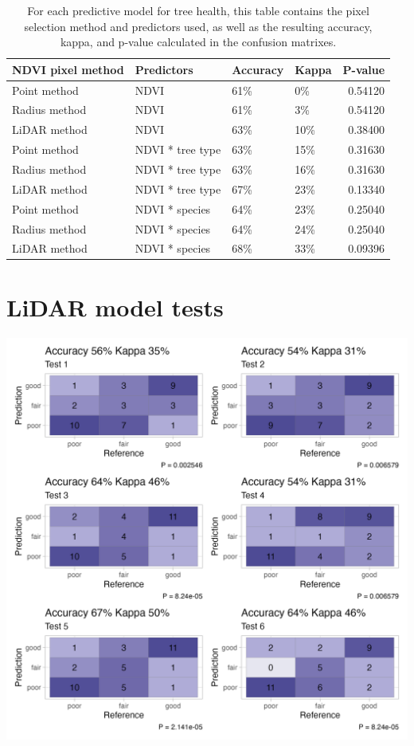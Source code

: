 \documentclass[12pt,twoside]{reedthesis}
\begin{document}
\begin{longtable}[t]{llllr}
\caption[Summary of results from various predictive models]{\label{tab:model-table}For each predictive model for tree health, this table contains the pixel selection method and predictors used, as well as the resulting accuracy, kappa, and p-value calculated in the confusion matrixes.}\\
\toprule
NDVI pixel method & Predictors & Accuracy & Kappa & P-value\\
\midrule
Point method & NDVI & 61\% & 0\% & 0.54120\\
Radius method & NDVI & 61\% & 3\% & 0.54120\\
LiDAR method & NDVI & 63\% & 10\% & 0.38400\\
Point method & NDVI * tree type & 63\% & 15\% & 0.31630\\
Radius method & NDVI * tree type & 63\% & 16\% & 0.31630\\
\addlinespace
LiDAR method & NDVI * tree type & 67\% & 23\% & 0.13340\\
Point method & NDVI * species & 64\% & 23\% & 0.25040\\
Radius method & NDVI * species & 64\% & 24\% & 0.25040\\
LiDAR method & NDVI * species & 68\% & 33\% & 0.09396\\
\bottomrule
\end{longtable}
\hypertarget{lidar-model-tests}{%
\section{LiDAR model tests}\label{lidar-model-tests}}
\begin{center}\includegraphics[width=1\linewidth]{figure/test} \end{center}
\end{document}
